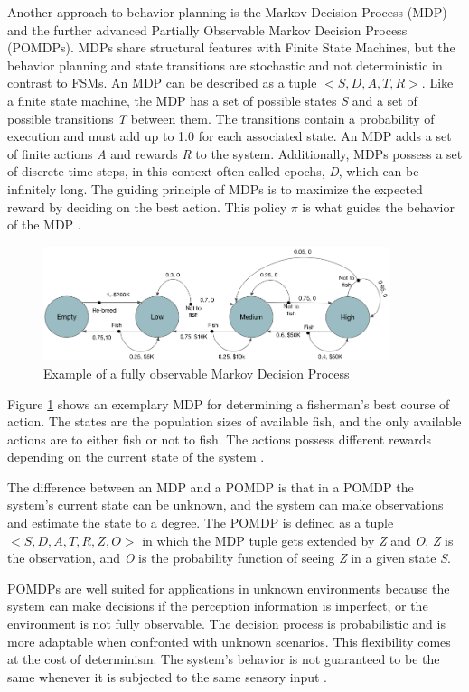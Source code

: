 Another approach to behavior planning is the Markov Decision Process (MDP) and the further advanced Partially Observable Markov Decision Process (POMDPs). MDPs share structural features with Finite State Machines, but the behavior planning and state transitions are stochastic and not deterministic in contrast to FSMs. An MDP can be described as a tuple $<S, D, A, T, R>$. Like a finite state machine, the MDP has a set of possible states \textit{S} and a set of possible transitions \textit{T} between them. The transitions contain a probability of execution and must add up to 1.0 for each associated state. An MDP adds a set of finite actions \textit{A} and rewards \textit{R} to the system. Additionally, MDPs possess a set of discrete time steps, in this context often called epochs, \textit{D}, which can be infinitely long. The guiding principle of MDPs is to maximize the expected reward by deciding on the best action. This policy $\pi$ is what guides the behavior of the MDP \cite{feyzabadi2014riskaware}.

\begin{figure}[ht]
	\centering
	\includegraphics[width=0.9\textwidth]{images/mdp.png} 
	\caption{Example of a fully observable Markov Decision Process \cite{andrew1999reinforcement, banerjee2021real}}
	\label{fig:mdp}
\end{figure}

Figure \ref{fig:mdp} shows an exemplary MDP for determining a fisherman's best course of action. The states are the population sizes of available fish, and the only available actions are to either fish or not to fish. The actions possess different rewards depending on the current state of the system \cite{tanwar2019markov}. 

The difference between an MDP and a POMDP is that in a POMDP the system's current state can be unknown, and the system can make observations and estimate the state to a degree. The POMDP is defined as a tuple $<S, D, A, T, R, Z, O>$ in which the MDP tuple gets extended by \textit{Z} and \textit{O}. \textit{Z} is the observation, and \textit{O} is the probability function of seeing \textit{Z} in a given state \textit{S}.

POMDPs are well suited for applications in unknown environments because the system can make decisions if the perception information is imperfect, or the environment is not fully observable. The decision process is probabilistic and is more adaptable when confronted with unknown scenarios. This flexibility comes at the cost of determinism. The system's behavior is not guaranteed to be the same whenever it is subjected to the same sensory input \cite{krishnamurthy2016partially}.


